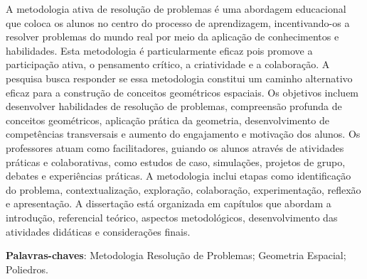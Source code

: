 
\setlength{\absparsep}{18pt} %
\begin{resumo}
    A metodologia ativa de resolução de problemas é uma abordagem educacional que coloca os alunos no centro do processo de aprendizagem, incentivando-os a resolver problemas do mundo real por meio da aplicação de conhecimentos e habilidades. Esta metodologia é particularmente eficaz pois promove a participação ativa, o pensamento crítico, a criatividade e a colaboração. A pesquisa busca responder se essa metodologia constitui um caminho alternativo eficaz para a construção de conceitos geométricos espaciais. Os objetivos incluem desenvolver habilidades de resolução de problemas, compreensão profunda de conceitos geométricos, aplicação prática da geometria, desenvolvimento de competências transversais e aumento do engajamento e motivação dos alunos. Os professores atuam como facilitadores, guiando os alunos através de atividades práticas e colaborativas, como estudos de caso, simulações, projetos de grupo, debates e experiências práticas. A metodologia inclui etapas como identificação do problema, contextualização, exploração, colaboração, experimentação, reflexão e apresentação. A dissertação está organizada em capítulos que abordam a introdução, referencial teórico, aspectos metodológicos, desenvolvimento das atividades didáticas e considerações finais.

    \textbf{Palavras-chaves}:  Metodologia Resolução de Problemas; Geometria Espacial; Poliedros.

\end{resumo}
